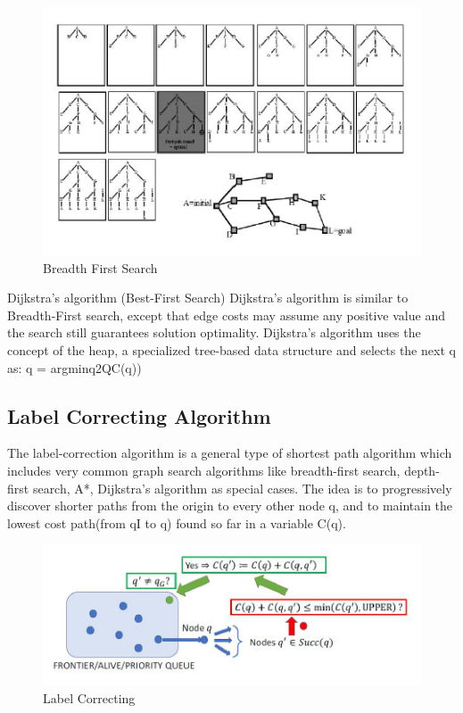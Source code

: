 \documentclass[twoside]{article}
\begin{document}
\begin{figure}[h!]
\begin{center}
\includegraphics{fig15_9.PNG}
\caption{Breadth First Search}
\end{center}
\end{figure}

Dijkstra’s algorithm (Best-First Search)
Dijkstra’s algorithm is similar to Breadth-First search, except that edge costs may assume any positive value and the search still guarantees solution optimality. Dijkstra’s algorithm uses the concept of the heap, a specialized tree-based data structure and selects the next q as: q = argminq2QC(q))

\subsection{Label Correcting Algorithm}
The label-correction algorithm is a general type of shortest path algorithm which includes very common graph search algorithms like breadth-first search, depth-first search, A*, Dijkstra’s algorithm as special cases.
The idea is to progressively discover shorter paths from the origin to every other node q, and to maintain the lowest cost path(from qI to q) found so far in a variable C(q).

\begin{figure}[h]
\begin{center}
\includegraphics{fig15_10.PNG}
\caption{Label Correcting}
\end{center}
\end{figure}
\end{document}
